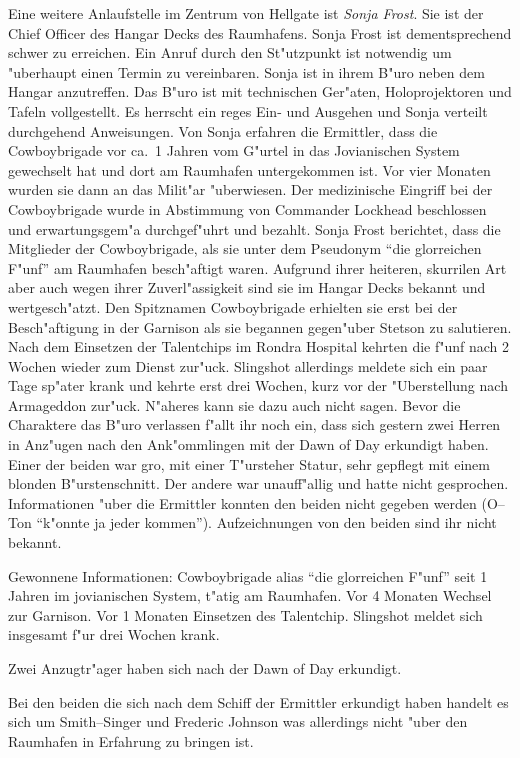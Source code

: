 
Eine weitere Anlaufstelle im Zentrum von Hellgate ist \emph{Sonja Frost}. Sie ist der Chief Officer des Hangar Decks des Raumhafens. Sonja Frost ist dementsprechend schwer zu erreichen. Ein Anruf durch den St"utzpunkt ist notwendig um "uberhaupt einen Termin zu vereinbaren. Sonja ist in ihrem B"uro neben dem Hangar anzutreffen. Das B"uro ist mit technischen Ger"aten, Holoprojektoren und Tafeln vollgestellt. Es herrscht ein reges Ein- und Ausgehen und Sonja verteilt durchgehend Anweisungen. Von Sonja erfahren die Ermittler, dass die Cowboybrigade vor ca.~1 Jahren vom G"urtel in das Jovianischen System gewechselt hat und dort am Raumhafen untergekommen ist. Vor vier Monaten wurden sie dann an das Milit"ar "uberwiesen. Der medizinische Eingriff bei der Cowboybrigade wurde in Abstimmung von Commander Lockhead beschlossen und erwartungsgem"a\3 durchgef"uhrt und bezahlt. Sonja Frost berichtet, dass die Mitglieder der Cowboybrigade, als sie unter dem Pseudonym "`die glorreichen F"unf"' am Raumhafen besch"aftigt waren. Aufgrund ihrer heiteren, skurrilen Art aber auch wegen ihrer Zuverl"assigkeit sind sie im Hangar Decks bekannt und wertgesch"atzt.  Den Spitznamen Cowboybrigade erhielten sie erst bei der Besch"aftigung in der Garnison als sie begannen gegen"uber Stetson zu salutieren. Nach dem Einsetzen der Talentchips im Rondra Hospital kehrten die f"unf nach 2 Wochen wieder zum Dienst zur"uck. Slingshot allerdings meldete sich ein paar Tage sp"ater krank und kehrte erst drei Wochen, kurz vor der "Uberstellung nach Armageddon zur"uck. N"aheres kann sie dazu auch nicht sagen. Bevor die Charaktere das B"uro verlassen f"allt ihr noch ein, dass sich gestern zwei Herren in Anz"ugen nach den Ank"ommlingen mit der Dawn of Day erkundigt haben. Einer der beiden war gro\3, mit einer T"ursteher Statur, sehr gepflegt mit einem blonden B"urstenschnitt. Der andere war unauff"allig und hatte nicht gesprochen. Informationen "uber die Ermittler konnten den beiden nicht gegeben werden (O--Ton "`k"onnte ja jeder kommen"'). Aufzeichnungen von den beiden sind ihr nicht bekannt.


\begin{remarks}
	Gewonnene Informationen: Cowboybrigade alias "`die glorreichen F"unf"' seit 1 Jahren im jovianischen System, t"atig am Raumhafen. Vor 4 Monaten Wechsel zur Garnison. Vor 1 Monaten Einsetzen des Talentchip. Slingshot meldet sich insgesamt f"ur drei Wochen krank. 
	
	Zwei Anzugtr"ager haben sich nach der Dawn of Day erkundigt.

	Bei den beiden die sich nach dem Schiff der Ermittler erkundigt haben handelt es sich um Smith--Singer und Frederic Johnson was allerdings nicht "uber den Raumhafen in Erfahrung zu bringen ist.
\end{remarks}


